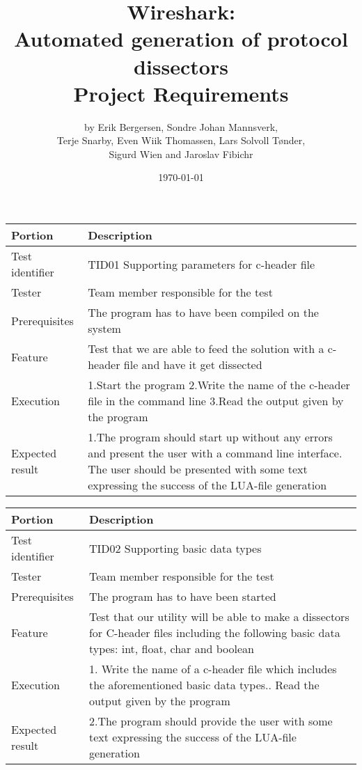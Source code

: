\documentclass[a4paper, 11pt]{report}
\title{Wireshark:\\ Automated generation of protocol dissectors\\
		Project Requirements}
\author{by Erik Bergersen, Sondre Johan Mannsverk,\\ Terje Snarby,
		Even Wiik Thomassen, Lars Solvoll Tønder,\\ Sigurd Wien
		and Jaroslav Fibichr}
\date{\today}
\begin{document}
\begin{table}[H]
\begin{tabularx}{\textwidth}{l X}
\hline\hline
Portion & Description\\[0.5ex]
\hline
Test identifier & TID01 Supporting parameters for c-header file\\[0.5ex]
Tester & Team member responsible for the test\\[0.5ex]
Prerequisites & The program has to have been compiled on the system\\[0.5ex]
Feature & Test that we are able to feed the solution with a c-header file and have it get dissected\\
Execution & 1.Start the program\newline
		2.Write the name of the c-header file in the command line\newline
		 3.Read the output given by the program\\ 
Expected result & 1.The program should start up without any errors and present the user with a command line interface\newline
3. The user should be presented with some text expressing the success of the LUA-file generation\\[0.5ex]
\hline\hline
\end{tabularx}


\begin{tabularx}{\textwidth}{l X}
\hline\hline
Portion & Description\\[0.5ex]
\hline
Test identifier & TID02 Supporting basic data types\\[0.5ex]
Tester & Team member responsible for the test\\[0.5ex]
Prerequisites & The program has to have been started\\[0.5ex]
Feature & Test that our utility will be able to make a dissectors for C-header files including the following basic data types: int, float, char and boolean \\
Execution & 1. Write the name of a c-header file which includes the aforementioned basic data types.\newline
		2. Read the output given by the program\\ 
Expected result & 2.The program should provide the user with some text expressing the success of the LUA-file generation\\[0.5ex]
\hline\hline
\end{tabularx}



\end{table}
\end{document}
